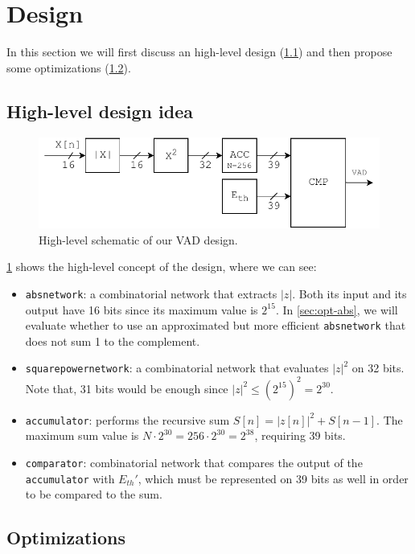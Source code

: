 \section{Design}
In this section we will first discuss an high-level design (\ref{sec:high-level})
and then propose some optimizations (\ref{sec:optimizations}).

\subsection{High-level design idea}
\label{sec:high-level}

\begin{figure}[h!]
  \centering
  \includegraphics{figs/vad_simple_schematic.pdf}
  \caption{High-level schematic of our VAD design.}
  \label{fig:simple_schematic}
\end{figure}

\cref{fig:simple_schematic} shows the high-level concept of the design, where we
can see:
\begin{itemize}
  \item \texttt{absnetwork}: a combinatorial network that extracts $|z|$. Both
    its input and its output have 16 bits since its maximum value is $2^{15}$.
    In \cref{sec:opt-abs}, we will evaluate whether to use an approximated
    but more efficient \texttt{absnetwork} that does not sum 1 to the complement.
  \item \texttt{squarepowernetwork}: a combinatorial network that evaluates
    $|z|^2$ on 32 bits. Note that, 31 bits would be enough since
    $|z|^2 \le (2^{15})^2 = 2^{30}$.
  \item \texttt{accumulator}: performs the recursive sum $S[n] = |z[n]|^2 + S[n - 1]$.
    The maximum sum value is $N \cdot 2^{30} = 256 \cdot 2^{30} = 2^{38}$,
    requiring 39 bits.
  \item \texttt{comparator}: combinatorial network that compares the output
    of the \texttt{accumulator} with $E_{th}'$, which must be represented on 39
    bits as well in order to be compared to the sum.
\end{itemize}

\subsection{Optimizations}
\label{sec:optimizations}

